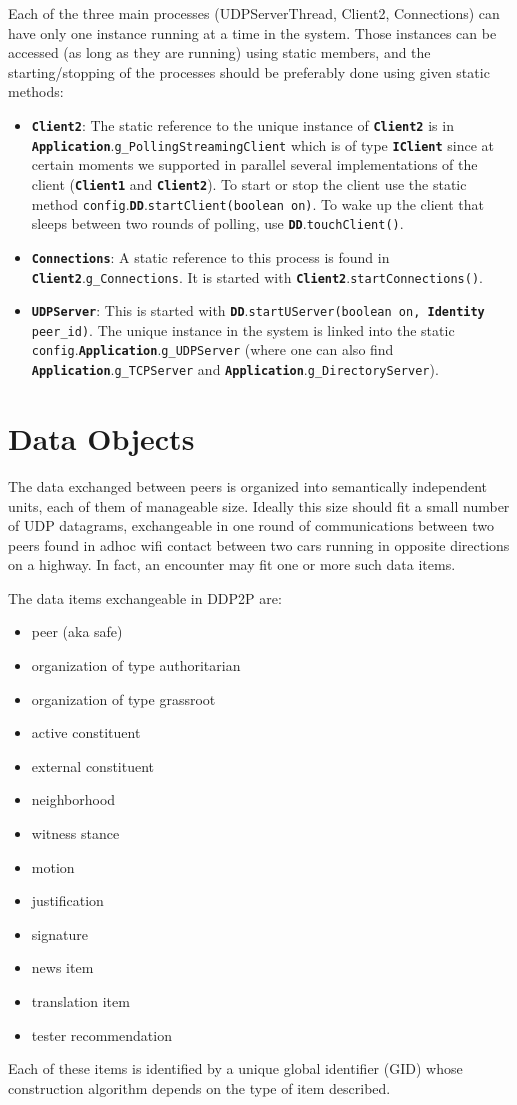 \documentclass{book}
\newcommand{\pkg}[1]{{\tt #1}}
\newcommand{\cls}[1]{{\tt\bf #1}}
\newcommand{\mth}[1]{{\tt #1}}
\newcommand{\mmb}[1]{{\tt #1}}
\begin{document}
Each of the three main processes (UDPServerThread, Client2, Connections) can have only one instance 
running at a time in the system. Those instances can be accessed (as long as they are running) using
static members, and the starting/stopping of the processes should be preferably done using given static methods:
\begin{itemize}
\item
\cls{Client2}: The static reference to the unique instance of \cls{Client2} is in \cls{Application}.\mmb{g\_PollingStreamingClient} which is of type \cls{IClient} since at certain moments we supported in parallel several implementations of the client (\cls{Client1} and \cls{Client2}).
To start or stop the client use the static method \pkg{config}.\cls{DD}.\mth{startClient(boolean on)}. To wake up the client
that sleeps between two rounds of polling, use \cls{DD}.\mth{touchClient()}.
\item
\cls{Connections}: A static reference to this process is found in \cls{Client2}.\mth{g\_Connections}. It is started with \cls{Client2}.\mth{startConnections()}.
\item
\cls{UDPServer}: This is started with \cls{DD}.\mth{startUServer(boolean on, \cls{Identity} peer\_id)}. The unique instance in the system is linked into the static
\pkg{config}.\cls{Application}.\mth{g\_UDPServer} (where one can also find \cls{Application}.\mth{g\_TCPServer} and \cls{Application}.\mth{g\_DirectoryServer}).
\end{itemize}

\chapter{Data Objects}
The data exchanged between peers is organized into semantically independent units, each of them of manageable size.
Ideally this size should fit a small number of UDP datagrams, exchangeable in one round of communications between two peers found in
adhoc wifi contact between two cars running in opposite directions on a highway. In fact, an encounter may fit one or more such data items.

The data items exchangeable in DDP2P are:
\begin{itemize}
\item
peer (aka safe)
\item
organization of type authoritarian
\item
organization of type grassroot
\item
active constituent
\item
external constituent
\item
neighborhood
\item
witness stance
\item
motion
\item
justification
\item
signature
\item
news item
\item
translation item
\item
tester recommendation
\end{itemize}
Each of these items is identified by a unique global identifier (GID) whose construction algorithm depends on the type of item described.
\end{document}
